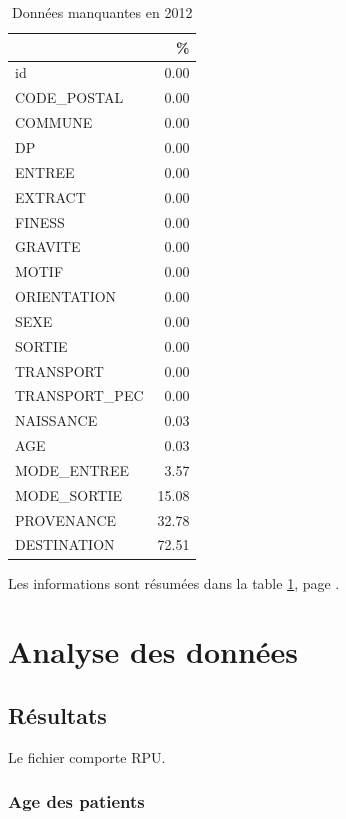 \documentclass[12pt,english,french]{report}
\begin{document}
\begin{table}[ht]
\centering
\begin{tabular}{|l|r|}
  \hline
 & \% \\ 
  \hline
id & 0.00 \\ 
  CODE\_POSTAL & 0.00 \\ 
  COMMUNE & 0.00 \\ 
  DP & 0.00 \\ 
  ENTREE & 0.00 \\ 
  EXTRACT & 0.00 \\ 
  FINESS & 0.00 \\ 
  GRAVITE & 0.00 \\ 
  MOTIF & 0.00 \\ 
  ORIENTATION & 0.00 \\ 
  SEXE & 0.00 \\ 
  SORTIE & 0.00 \\ 
  TRANSPORT & 0.00 \\ 
  TRANSPORT\_PEC & 0.00 \\ 
  NAISSANCE & 0.03 \\ 
  AGE & 0.03 \\ 
  MODE\_ENTREE & 3.57 \\ 
  MODE\_SORTIE & 15.08 \\ 
  PROVENANCE & 32.78 \\ 
  DESTINATION & 72.51 \\ 
   \hline
\end{tabular}
\caption{Données manquantes en 2012} 
\label{tab2}
\end{table}

Les informations sont résumées dans la table \ref{tab2}, page \pageref{tab2}.

\chapter{Analyse des données}

\section{Résultats}

Le fichier comporte  RPU.

%
%

\subsection{Age des patients}
\end{document}
